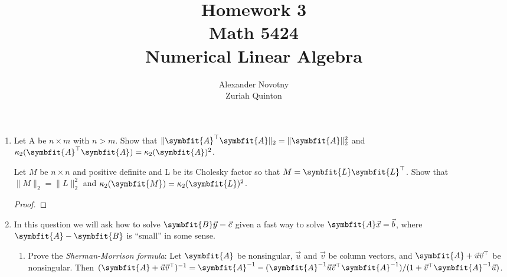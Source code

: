 \documentclass{article}
\title{Homework 3\\{\large Math 5424}\\{\large Numerical Linear Algebra}}
\author{Alexander Novotny\\Zuriah Quinton}
\theoremstyle{definition}
\newcommand{\mat}[1]{\symbfit{#1}}
\begin{document}
\maketitle

\begin{enumerate}[leftmargin=\labelsep]
	\item Let A be \(n \times m\) with \(n > m\). Show that \(\|\mat{A}^\top\mat{A}\|_2 = \|\mat{A}\|_2^2\) and \(\kappa_2 (\mat{A}^\top\mat{A}) = \kappa_2 (\mat{A})^2\).

	      Let \(M\) be \(n \times n\) and positive definite and L be its Cholesky factor so that \(M = \mat{L}\mat{L}^\top\). Show that \(\|M\|_2 = \|L\|_2^2\) and \(\kappa_2(\mat{M}) = \kappa_2(\mat{L})^2\).
	      \begin{proof}

	      \end{proof}

	\item In this question we will ask how to solve \(\mat{B}\vec{y} = \vec{c}\) given a fast way to solve \(\mat{A}\vec{x} = \vec{b}\), where \(\mat{A} - \mat{B}\) is ``small'' in some sense.
	      \begin{enumerate}
		      \item Prove the \emph{Sherman-Morrison formula}: Let \(\mat{A}\) be nonsingular, \(\vec{u}\) and \(\vec{v}\) be column vectors, and \(\mat{A} + \vec{u}\vec{v}^\top\) be nonsingular. Then \((\mat{A} + \vec{u}\vec{v}^\top)^{-1} = \mat{A}^{-1} - (\mat{A}^{-1}\vec{u}\vec{v}^\top\mat{A}^{-1})/(1 + \vec{v}^\top \mat{A}^{-1} \vec{u})\). \label{item:sherman-morrison}


\end{enumerate}
\end{enumerate}
\end{document}
